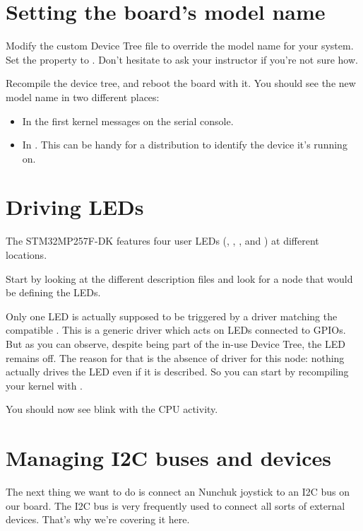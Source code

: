 \section{Setting the board's model name}

Modify the custom Device Tree file to override the model name for your
system. Set the  property to . Don't hesitate to ask your instructor if you're not sure how.

Recompile the device tree, and reboot the board with it. You should see
the new model name in two different places:

\begin{itemize}
\item In the first kernel messages on the serial console.
\item In . This can be
      handy for a distribution to identify the device it's running on.
\end{itemize}

\section{Driving LEDs}

The STM32MP257F-DK features four user LEDs (, , , and )
at different locations.

Start by looking at the different description files and look for a node
that would be defining the LEDs.

Only one LED is actually supposed to be triggered by a driver matching
the compatible . This is a generic driver which acts on
LEDs connected to GPIOs. But as you can observe, despite being part of
the in-use Device Tree, the LED remains off. The reason for that is the
absence of driver for this node: nothing actually drives the LED even
if it is described. So you can start by recompiling your kernel with
.

You should now see  blink with the CPU activity.

\section{Managing I2C buses and devices}

The next thing we want to do is connect an Nunchuk joystick
to an I2C bus on our board. The I2C bus is very frequently used
to connect all sorts of external devices. That's why we're covering
it here.

